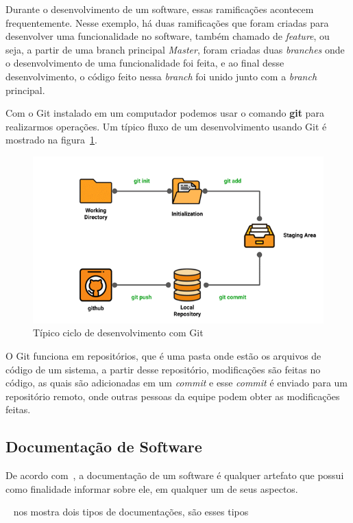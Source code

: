 \documentclass[12pt]{article}
\begin{document}
Durante o desenvolvimento de um software, essas ramificações acontecem frequentemente. Nesse exemplo,
há duas ramificações que foram criadas para desenvolver uma funcionalidade no software, também chamado de \textit{feature},
ou seja, a partir de uma branch principal \textit{Master}, foram criadas duas \textit{branches} onde o desenvolvimento
de uma funcionalidade foi feita, e ao final desse desenvolvimento, o código feito nessa \textit{branch} foi
unido junto com a \textit{branch} principal.

Com o Git instalado em um computador podemos usar o comando \textbf{git} para realizarmos operações.
Um típico fluxo de um desenvolvimento usando Git é mostrado na figura~\ref{fig:git-lifecycle}.

\begin{figure}[H]
  \centering
  \includegraphics[width=.8\textwidth]{git-lifecycle.png}
  \caption{Típico ciclo de desenvolvimento com Git}\label{fig:git-lifecycle}
\end{figure}

O Git funciona em repositórios, que é uma pasta onde estão os arquivos de código de um sistema,
a partir desse repositório, modificações são feitas no código, as quais são adicionadas em um \textit{commit}
e esse \textit{commit} é enviado para um repositório remoto, onde outras pessoas da equipe podem obter as modificações feitas.


\subsection{Documentação de Software}

De acordo com~\cite{Forward02softwaredocumentation}, a documentação de um software é qualquer
artefato que possui como finalidade informar sobre ele, em qualquer um de seus aspectos.

~\cite{Coelho_2009} nos mostra dois tipos de documentações, são esses tipos
\end{document}
